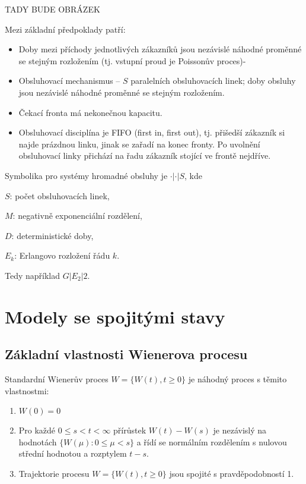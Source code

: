 \documentclass[10pt]{article}
\begin{document}
TADY BUDE OBRÁZEK

Mezi základní předpoklady patří:
\begin{itemize}
\item Doby mezi příchody jednotlivých zákazníků jsou nezávislé náhodné proměnné se stejným rozložením (tj. vstupní proud je Poissonův proces)-
\item Obsluhovací mechanismus -- $S$ paralelních obsluhovacích linek; doby obsluhy jsou nezávislé náhodné proměnné se stejným rozložením.
\item Čekací fronta má nekonečnou kapacitu.
\item Obsluhovací disciplína je FIFO (first in, first out), tj. přišedší zákazník si najde prázdnou linku, jinak se zařadí na konec fronty. Po uvolnění obsluhovací linky přichází na řadu zákazník stojící ve frontě nejdříve.
\end{itemize}
Symbolika pro systémy hromadné obsluhy je $\cdot | \cdot | S$, kde 

$S$: počet obsluhovacích linek,

$M$: negativně exponenciální rozdělení,

$D$: deterministické doby,

$E_k$: Erlangovo rozložení řádu $k$.

Tedy například $G|E_2|2$.

\section{Modely se spojitými stavy}

\subsection{Základní vlastnosti Wienerova procesu}
Standardní Wienerův proces $W=\{W(t),t \geq 0 \}$ je náhodný proces s těmito vlastnostmi:
\begin{enumerate}
\item $W(0)=0$
\item Pro každé $0 \leq s < t < \infty$ přírůstek $W(t)-W(s)$ je nezávislý na hodnotách $\{W(\mu):0 \leq \mu < s\}$ a řídí se normálním rozdělením s nulovou střední hodnotou a rozptylem $t-s$.
\item Trajektorie procesu $W=\{W(t),t \geq 0 \}$ jsou spojité s pravděpodobností 1.
\end{enumerate}
\end{document}
